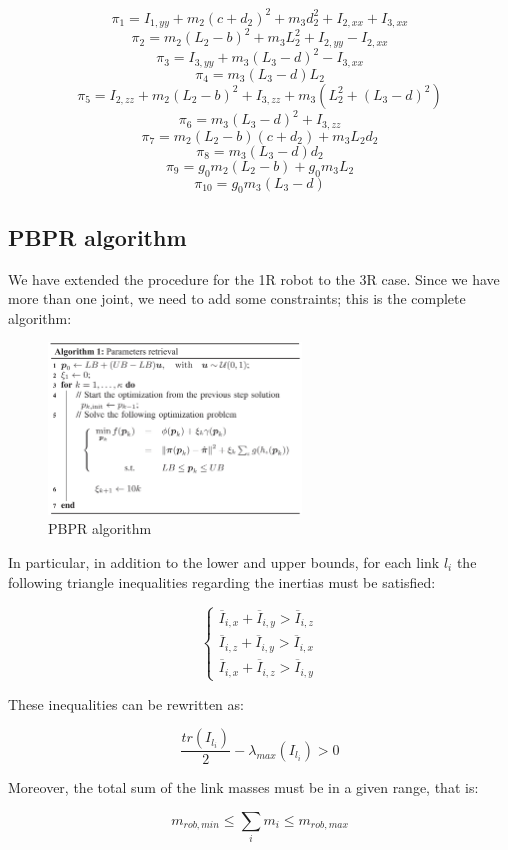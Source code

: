 \documentclass{article}
\begin{document}
\[\pi_1= I_{1,yy} + m_2 (c+ d_2)^2 + m_3 d_2^2 + I_{2,xx} + I_{3,xx}\]
\[\pi_2 = m_2(L_2 -b)^2 + m_3 L_2^2 + I_{2,yy} - I_{2,xx}\]
\[\pi_3 = I_{3,yy} + m_3(L_3 - d)^2 - I_{3,xx}\]
\[\pi_4 = m_3(L_3 -d)L_2\]
\[\pi_5 = I_{2,zz} + m_2(L_2 - b)^2 + I_{3,zz} + m_3(L_2^2 + (L_3 - d)^2 )\]
\[\pi_6 = m_3(L_3 -d)^2 + I_{3,zz}\]
\[\pi_7 = m_2(L_2 - b)(c+ d_2) + m_3 L_2 d_2\]
\[\pi_8 = m_3(L_3 - d)d_2\]
\[\pi_9 = g_0 m_2 (L_2 - b) + g_0 m_3 L_2\]
\[\pi_{10} = g_0 m_3 (L_3 - d)\]

\subsection{PBPR algorithm}
We have extended the procedure for the 1R robot to the 3R case. Since we have more than one joint, we need to add some constraints; this is the complete algorithm:
\FloatBarrier
\begin{figure}[!htbp]
\centering
\includegraphics[width=0.6\textwidth]{images/3-dof/algorithm.png}
\caption{PBPR algorithm}
\end{figure}
\FloatBarrier
In particular, in addition to the lower and upper bounds, for each link $l_i$ the following triangle inequalities regarding the inertias must be satisfied:

\[\begin{cases}
\overline{I}_{i,x}+\overline{I}_{i,y} > \overline{I}_{i,z} \\
\overline{I}_{i,z}+\overline{I}_{i,y} > \overline{I}_{i,x} \\
\overline{I}_{i,x}+\overline{I}_{i,z} > \overline{I}_{i,y}
\end{cases}\]

\noindent These inequalities can be rewritten as:

\[\frac{tr(I_{l_i})}{2}-\lambda_{max}(I_{l_i})>0\]

\noindent Moreover, the total sum of the link masses must be in a given range, that is:

\[m_{rob,min}\le \sum_i{m_i} \le m_{rob,max}\]
\end{document}
